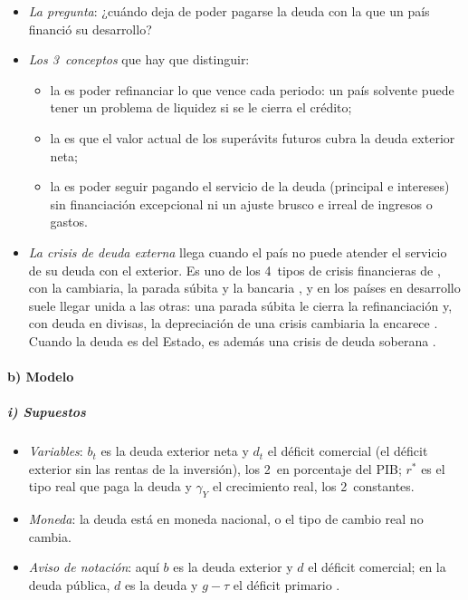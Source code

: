 \documentclass[11pt]{article}
\begin{document}
\begin{itemize}
\item \emph{La pregunta}: ¿cuándo deja de poder pagarse la deuda con la que un país financió su desarrollo?
\item \emph{Los 3~conceptos} que hay que distinguir\nocite{MilesiFerrettiRazin1996}:
  \begin{itemize}
  \item la  es poder refinanciar lo que vence cada periodo: un país solvente puede tener un problema de liquidez si se le cierra el crédito;
  \item la  es que el valor actual de los superávits futuros cubra la deuda exterior neta;
  \item la  es poder seguir pagando el servicio de la deuda (principal e intereses) sin financiación excepcional ni un ajuste brusco e irreal de ingresos o gastos\nocite{FMI2002Sustainability}.
  \end{itemize}
\item \emph{La crisis de deuda externa} llega cuando el país no puede atender el servicio de su deuda con el exterior. Es uno de los 4~tipos de crisis financieras de \textcite{ClaessensKose2013Financial}, con la cambiaria, la parada súbita y la bancaria , y en los países en desarrollo suele llegar unida a las otras: una parada súbita le cierra la refinanciación y, con deuda en divisas, la depreciación de una crisis cambiaria la encarece . Cuando la deuda es del Estado, es además una crisis de deuda soberana .
\end{itemize}

\paragraph{b) Modelo}

\subparagraph{i) Supuestos}

\begin{itemize}
\item \emph{Variables}: $b_t$ es la deuda exterior neta y $d_t$ el déficit comercial (el déficit exterior sin las rentas de la inversión), los 2~en porcentaje del PIB; $r^*$ es el tipo real que paga la deuda y $\gamma_Y$ el crecimiento real, los 2~constantes.
\item \emph{Moneda}: la deuda está en moneda nacional, o el tipo de cambio real no cambia.
\item \emph{Aviso de notación}: aquí $b$ es la deuda exterior y $d$ el déficit comercial; en la deuda pública, $d$ es la deuda y $g-\tau$ el déficit primario .
\end{itemize}
\end{document}

